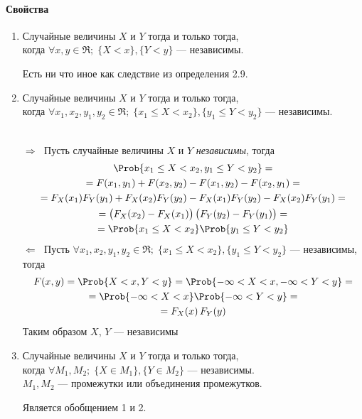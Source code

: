\paragraph{Свойства}
	\begin{enumerate}
		\item Случайные величины $X$ и $Y$  тогда и только тогда,\\ когда $\forall x, y \in \Re;\; \{ X < x \}, \{Y < y\}$ --- независимы.
		\begin{Proof}
			Есть ни что иное как следствие из определения 2.9.
		\end{Proof}
		
		\item Случайные величины $X$ и $Y$  тогда и только тогда,\\ когда $\forall x_1, x_2, y_1, y_2 \in \Re;\; \{ x_1 \leq X < x_2 \}, \{ y_1 \leq Y < y_2\}$ --- независимы.
		\begin{Proof}\\
			$\Rightarrow\;$ Пусть случайные величины $X$ и $Y$ \textit{независимы}, тогда
			\begin{multline*}
				\Prob\{x_1 \leq X < x_2, y_1 \leq Y < y_2\} = \\ 
				= F(x_1, y_1) + F(x_2, y_2) - F(x_1, y_2) - F(x_2, y_1) = \\
				= F_{X}(x_1)F_Y(y_1) + F_{X}(x_2)F_Y(y_2) - F_{X}(x_1)F_Y(y_2) - F_{X}(x_2)F_Y(y_1) = \\
				= \bigl(F_{X}(x_2) - F_{X}(x_1)\bigr)\,\bigl(F_{Y}(y_2) - F_{Y}(y_1)\bigr) = \\
				= \Prob\{ x_1 \leq X < x_2 \} \Prob\{ y_1 \leq Y < y_2 \} 
			\end{multline*}
			$\Leftarrow\;$ Пусть $\forall x_1, x_2, y_1, y_2 \in \Re;\; \{ x_1 \leq X < x_2 \}, \{ y_1 \leq Y < y_2\}$ --- независимы, тогда
			\begin{multline*}
				F(x, y) = \Prob\{ X < x, Y < y \} = \Prob\{ -\infty < X < x, -\infty < Y < y \} = \\
				= \Prob\{-\infty < X < x\} \Prob\{ -\infty < Y < y \} = \\
				= F_X(x)\,F_Y(y)
			\end{multline*}
			Таким образом $X$, $Y$ --- независимы\\
		\end{Proof}
		
		\item Случайные величины $X$ и $Y$  тогда и только тогда,\\ когда $\forall M_1, M_2;\; \{ X \in M_1 \}, \{ Y \in M_2 \}$ --- независимы. \\ $M_1, M_2$ --- промежутки или объединения промежутков.
		\begin{Proof}
			Является обобщением 1 и 2.
		\end{Proof}
		

\end{enumerate}
